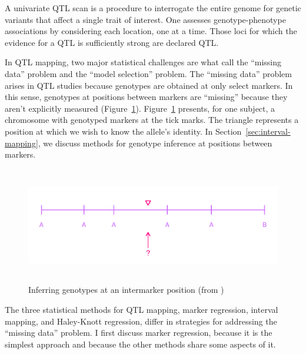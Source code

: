 \documentclass[oneside]{book}\usepackage[]{graphicx}\usepackage[]{color}
\makeatletter
\def\maxwidth{ %
  \ifdim\Gin@nat@width>\linewidth
    \linewidth
  \else
    \Gin@nat@width
  \fi
}
\newenvironment{knitrout}{}{} %
\def\maxwidth{\ifdim\Gin@nat@width>\linewidth\linewidth\else\Gin@nat@width\fi}
\makeatother
\begin{document}
A univariate QTL scan is a procedure to interrogate the entire genome for genetic
variants that affect a single trait of interest. 
One assesses genotype-phenotype associations by considering each location, one at a time. 
Those loci for which the evidence for a QTL is sufficiently
strong are declared QTL. 


In QTL mapping, two major statistical challenges are what \citet{broman2009guide} call 
the ``missing data'' problem and the ``model selection'' problem. 
The ``missing data'' problem arises in QTL studies because genotypes are obtained
at only select markers. In this sense, genotypes at positions between
markers are ``missing'' because they aren't explicitly measured
(Figure~\ref{fig:genoprob1}). Figure~\ref{fig:genoprob1} presents, for
one subject, a chromosome with genotyped markers at the tick marks.
The triangle represents a position at which we wish to know the allele's identity.
In Section~\ref{sec:interval-mapping}, we discuss methods for genotype inference at positions between markers. 

\begin{knitrout}
\color{fgcolor}\begin{figure}
\includegraphics[width=\maxwidth,height=2in]{figure/genoprob1-1} \caption[Inferring genotypes at an intermarker position (from \citet{broman2009guide})]{Inferring genotypes at an intermarker position (from \citet{broman2009guide})}\label{fig:genoprob1}
\end{figure}


\end{knitrout}

The three statistical methods for QTL mapping, marker regression, 
interval mapping, and Haley-Knott regression, differ in strategies for addressing 
the ``missing data'' problem. I first discuss marker regression, because it is the 
simplest approach and because the other methods share some aspects of it.
\end{document}
